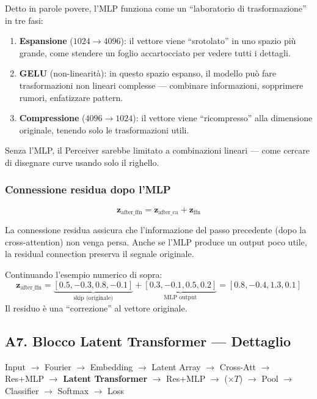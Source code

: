 \documentclass[12pt,a4paper]{article}
\begin{document}
\begin{notabox}
Detto in parole povere, l'MLP funziona come un ``laboratorio di trasformazione'' in tre fasi:
\begin{enumerate}
    \item \textbf{Espansione} ($1024 \to 4096$): il vettore viene ``srotolato'' in uno spazio pi\`u grande, come stendere un foglio accartocciato per vedere tutti i dettagli.
    \item \textbf{GELU} (non-linearit\`a): in questo spazio espanso, il modello pu\`o fare trasformazioni non lineari complesse --- combinare informazioni, sopprimere rumori, enfatizzare pattern.
    \item \textbf{Compressione} ($4096 \to 1024$): il vettore viene ``ricompresso'' alla dimensione originale, tenendo solo le trasformazioni utili.
\end{enumerate}
Senza l'MLP, il Perceiver sarebbe limitato a combinazioni lineari --- come cercare di disegnare curve usando solo il righello.
\end{notabox}

\subsubsection{Connessione residua dopo l'MLP}

\[
    \mathbf{z}_{\text{after\_ffn}} = \mathbf{z}_{\text{after\_ca}} + \mathbf{z}_{\text{ffn}}
\]

La connessione residua assicura che l'informazione del passo precedente (dopo la cross-attention) non venga persa. Anche se l'MLP produce un output poco utile, la residual connection preserva il segnale originale.

Continuando l'esempio numerico di sopra:
\[
    \mathbf{z}_{\text{after\_ffn}} = \underbrace{[0.5, -0.3, 0.8, -0.1]}_{\text{skip (originale)}} + \underbrace{[0.3, -0.1, 0.5, 0.2]}_{\text{MLP output}} = [0.8, -0.4, 1.3, 0.1]
\]
Il residuo \`e una ``correzione'' al vettore originale.


\subsection{A7. Blocco Latent Transformer --- Dettaglio} \label{sec:latent_detail}

\begin{pipelinebox}
Input $\to$ Fourier $\to$ Embedding $\to$ Latent Array $\to$ Cross-Att $\to$ Res+MLP $\to$ \textbf{Latent Transformer} $\to$ Res+MLP $\to$ ($\times T$) $\to$ Pool $\to$ Classifier $\to$ Softmax $\to$ Loss
\end{pipelinebox}
\end{document}
